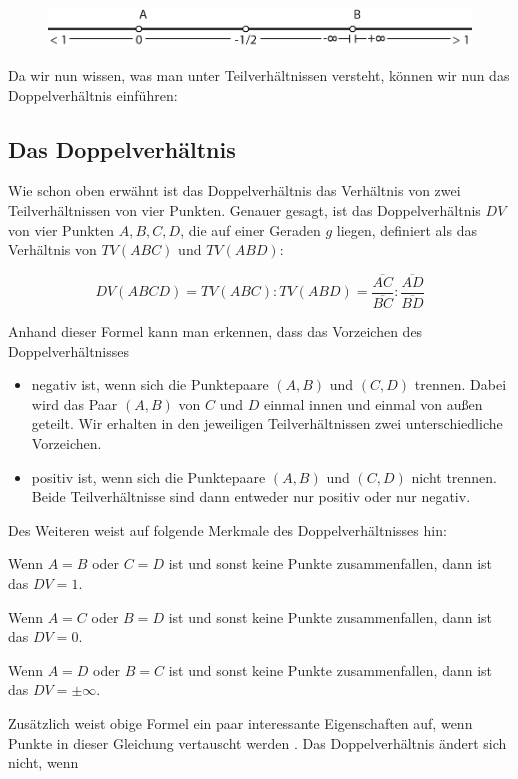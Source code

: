 \documentclass[12pt,a4paper]{article}
\begin{document}
\begin{figure}[htbp]
\centering
\includegraphics[width=\textwidth]{Bilder/tv_strahl.png}
\end{figure}

Da wir nun wissen, was man unter Teilverhältnissen versteht, können wir nun das Doppelverhältnis einführen:

\subsection{Das Doppelverhältnis}

Wie schon oben erwähnt ist das Doppelverhältnis das Verhältnis von zwei Teilverhältnissen von vier Punkten. Genauer gesagt, ist das Doppelverhältnis $DV$ von vier Punkten $A, B, C, D$, die auf einer Geraden $g$ liegen, definiert als das Verhältnis von $TV(A B C)$ und $TV(A B D)$:

\[DV(A B C D) = TV(A B C) : TV(A B D) = \dfrac{\overline{A C}}{\overline{B C}} : \dfrac{\overline{A D}}{\overline{B D}}\]

Anhand dieser Formel kann man erkennen, dass das Vorzeichen des Doppelverhältnisses
\begin{itemize}
\item negativ ist, wenn sich die Punktepaare $(A, B)$ und $(C, D)$ trennen. Dabei wird das Paar $(A, B)$ von $C$ und $D$ einmal innen und einmal von außen geteilt. Wir erhalten in den jeweiligen Teilverhältnissen zwei unterschiedliche Vorzeichen.
\item positiv ist, wenn sich die Punktepaare $(A, B)$ und $(C, D)$ nicht trennen. Beide Teilverhältnisse sind dann entweder nur positiv oder nur negativ.
\end{itemize}

Des Weiteren weist \citep{projektiveGeometrie} auf folgende Merkmale des Doppelverhältnisses hin:

Wenn $A = B$ oder $C = D$ ist und sonst keine Punkte zusammenfallen, dann ist das $DV = 1$.

Wenn $A = C$ oder $B = D$ ist und sonst keine Punkte zusammenfallen, dann ist das $DV = 0$.

Wenn $A = D$ oder $B = C$ ist und sonst keine Punkte zusammenfallen, dann ist das $DV = \pm\infty$.

Zusätzlich weist obige Formel ein paar interessante Eigenschaften auf, wenn Punkte in dieser Gleichung vertauscht werden \citep[vgl.][S.~77]{projektiveGeometrie}. Das Doppelverhältnis ändert sich nicht, wenn
\end{document}

